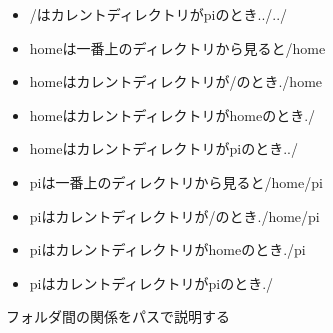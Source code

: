\begin{figure}[H]
\begin{minipage}{0.6\hsize}
\begin{itemize}
        \item /はカレントディレクトリがpiのとき../../
        \item homeは一番上のディレクトリから見ると/home
        \item homeはカレントディレクトリが/のとき./home
        \item homeはカレントディレクトリがhomeのとき./
        \item homeはカレントディレクトリがpiのとき../
        \item piは一番上のディレクトリから見ると/home/pi
        \item piはカレントディレクトリが/のとき./home/pi
        \item piはカレントディレクトリがhomeのとき./pi
        \item piはカレントディレクトリがpiのとき./
        \end{itemize}
    \end{minipage}
    \caption{フォルダ間の関係をパスで説明する}
    \label{fig:folder-path}
\end{figure}

